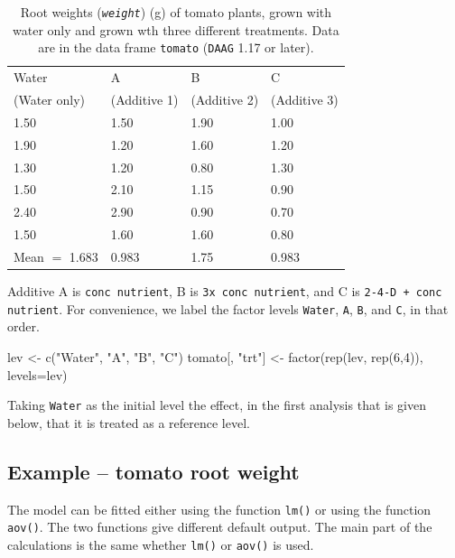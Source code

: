 \documentclass{tufte-book}\usepackage[]{graphicx}\usepackage[]{color}
\newcommand{\txtt}[1]{\texttt{#1}}
\begin{document}
\begin{table}[h]
\begin{tabular}{@{}llll@{}}
    Water & A  & B  & C  \\
 (Water only) & (Additive 1) & (Additive 2) & (Additive 3)\\
\hphantom{Mean $=$} 1.50 & 1.50  &1.90 &1.00 \\
\hphantom{Mean $=$} 1.90 & 1.20  &1.60 &1.20 \\
\hphantom{Mean $=$} 1.30 & 1.20 & 0.80 &1.30 \\
\hphantom{Mean $=$} 1.50 & 2.10 & 1.15 &0.90 \\
\hphantom{Mean $=$} 2.40 & 2.90 & 0.90 &0.70 \\
\hphantom{Mean $=$} 1.50 & 1.60 & 1.60 &0.80 \\
\hline
    Mean $=$ 1.683 & 0.983 & 1.75 & 0.983 \\
\end{tabular}
\caption{Root weights ({\em \txtt{weight}}) (g) of tomato
  plants, grown with water only and grown wth three different
  treatments. Data are in the data frame \txtt{tomato} (\txtt{DAAG}
  1.17 or later).\label{tab:tomatowt}}
\end{table}
\vspace*{9pt}

Additive A is \txtt{conc nutrient}, B is \txtt{3x conc nutrient}, and
C is \txtt{2-4-D + conc nutrient}.  For convenience, we label the factor levels
\txtt{Water}, \txtt{A}, \txtt{B}, and \txtt{C}, in that order.
\begin{Schunk}
\begin{Sinput}
lev <- c("Water", "A", "B", "C")
tomato[, "trt"] <- factor(rep(lev, rep(6,4)),
                          levels=lev)
\end{Sinput}
\end{Schunk}
Taking \txtt{Water} as the initial level the effect, in the first
analysis that is given below, that it is treated as a reference
level.

\subsection{Example -- tomato root weight}\label{tomato}

The model can be fitted either using the function \txtt{lm()} or
using the function \txtt{aov()}.  The two functions give different
default output.  The main part of the calculations is the same
whether \txtt{lm()} or \txtt{aov()} is used.
\end{document}
